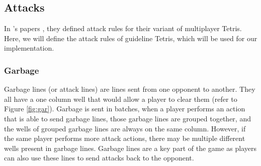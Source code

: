 \documentclass[a4paper, 12pt]{extreport}
\begin{document}
			\subsection{Attacks}
			
				In \citeauthor{tetris-learning-by-imitation}'s papers \cite{tetris-learning-by-imitation} \cite{tetris-bb-mc-planning}, they defined attack rules for their variant of multiplayer Tetris. Here, we will define the attack rules of guideline Tetris, which will be used for our implementation.
				
				\subsubsection{Garbage}
					
					Garbage lines (or attack lines) are lines sent from one opponent to another. They all have a one column well that would allow a player to clear them (refer to Figure \ref{fig:gar}). Garbage is sent in batches, when a player performs an action that is able to send garbage lines, those garbage lines are grouped together, and the wells of grouped garbage lines are always on the same column. However, if the same player performs more attack actions, there may be multiple different wells present in garbage lines. Garbage lines are a key part of the game as players can also use these lines to send attacks back to the opponent.
					
\end{document}
